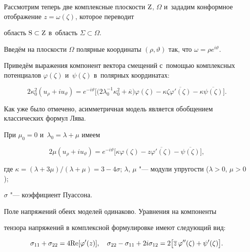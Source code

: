 Рассмотрим теперь две комплексные плоскости $\rm Z$, $\Omega$ и~зададим конформное отображение $z=\omega(\zeta)$, которое переводит

область  $\rm S \subset Z$ в~область $\Sigma\subset\Omega$. 

Введём на плоскости $\Omega$ полярные координаты $(\rho, \vartheta)$ так, что $\omega=\rho e^{i\vartheta}$. 

Приведём выражения компонент вектора смещений с~помощью комплексных потенциалов $\varphi(\zeta)$ и~$\psi(\zeta)$ в~полярных координатах:

\begin{equation}

2\kappa_{0}^2(u_{\rho}+iu_{\vartheta})=

e^{-i\vartheta}\bigg[\Big(2\lambda_{0}^{-1}\kappa_{0}^2+\overline{\kappa}\Big)

\varphi(\zeta)-\kappa \zeta \overline{\varphi'(\zeta)}-\kappa\overline{\psi(\zeta)}\bigg].

\label{bytev:eq4}

\end{equation}



Как уже было отмечено, асимметричная модель является обобщением классических формул Лява. 

При $\mu_{0}=0$ и~$\lambda_{0}=\lambda+\mu$ имеем

\begin{equation}

2\mu(u_{\rho}+iu_{\vartheta})=

e^{-i\vartheta}\big[\kappa\varphi(\zeta)-z\overline{\varphi'(\zeta)}-\overline{\psi(\zeta)}\big],

\label{bytev:eq5}

\end{equation}

где  $\kappa=(\lambda+3\mu)/(\lambda+\mu)=3-4\sigma$; $\lambda$, $\mu$ "---  модули упругости ($\lambda>0$, $\mu>0$); 

$\sigma$ "--- коэффициент Пуассона.



Поле напряжений обеих моделей одинаково. Уравнения на компоненты

тензора напряжений в комплексной формулировке имеют следующий вид:

$$\sigma_{11}+\sigma_{22}=4{\rm Re}[\varphi'(z)],\quad 

\sigma_{22}-\sigma_{11}+2i\sigma_{12}=2\big[\overline{z}\,\varphi''(\zeta)+\psi'(\zeta)\big].$$



